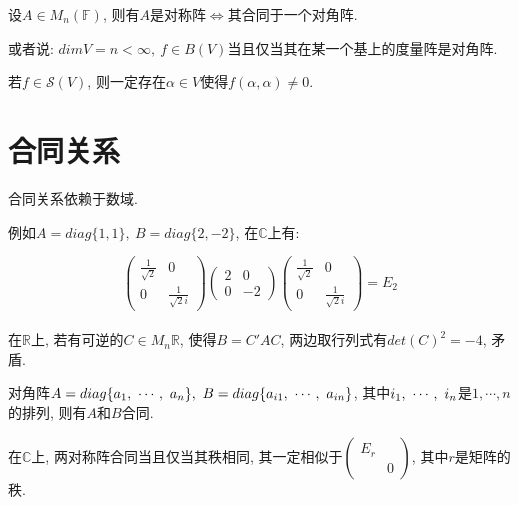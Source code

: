 \begin{theorem}[对称阵基本定理]
    设$A\in M_n(\mathbb{F})$, 则有$A$是对称阵$\Longleftrightarrow$其合同于一个对角阵.\par
    或者说: $dimV=n<\infty,\ f\in B(V)$当且仅当其在某一个基上的度量阵是对角阵.
\end{theorem}

\begin{lemma}
    若$f\in \mathscr{S}(V)$, 则一定存在$\alpha \in V$使得$f(\alpha,\alpha)\ne 0$.
\end{lemma}

\section{ 合同关系 }

\begin{example}
    合同关系依赖于数域.\par
    例如$A=diag\{1,1\},\ B=diag\{2,-2\}$, 在$\mathbb{C}$上有:\par
    \[\begin{pmatrix}
        \frac{1}{\sqrt{2}} & 0\\
        0 & \frac{1}{\sqrt{2}i}
    \end{pmatrix}\begin{pmatrix}
        2 & 0\\
        0 & -2
    \end{pmatrix}\begin{pmatrix}
        \frac{1}{\sqrt{2}} & 0\\
        0 & \frac{1}{\sqrt{2}i}
    \end{pmatrix}=E_2\]\\
    在$\mathbb{R}$上, 若有可逆的$C\in M_n{\mathbb{R}}$, 使得$B=C'AC$, 两边取行列式有$det(C)^2=-4$, 矛盾.
\end{example}

\begin{lemma}
    对角阵$A=diag\{\vectorset{a}{n}\},\ B=diag\{\vectorsubset{a}{i}{n}\}$, 其中${i}{_1},\ \cdots,\ {i}{_{n}}$是$1,\cdots,n$的排列, 则有$A$和$B$合同.
\end{lemma}

\begin{inference}
    在$\mathbb{C}$上, 两对称阵合同当且仅当其秩相同, 其一定相似于$\begin{pmatrix}
        E_r &\\
         & 0
    \end{pmatrix}$, 其中$r$是矩阵的秩.
\end{inference}

